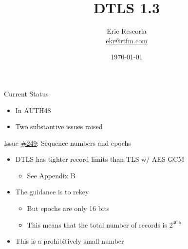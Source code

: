 \documentclass[helvetica]{beamer}
\title{DTLS 1.3}
\author{Eric Rescorla \\\url{ekr@rtfm.com}}
\date{\today}
\begin{document}
\begin{frame}
  \titlepage
\end{frame}


\begin{frame}{Current Status}

  \begin{itemize}
  \item In AUTH48
  \item Two substantive issues raised
  \end{itemize}
\end{frame}

\begin{frame}{Issue \href{https://github.com/tlswg/dtls13-spec/issues/249}{\#249}: Sequence numbers and epochs}

  \begin{itemize}
  \item DTLS has tighter record limits than TLS w/ AES-GCM
    \begin{itemize}
    \item See Appendix B      
    \end{itemize}

  \item The guidance is to rekey
    \begin{itemize}
    \item But epochs are only 16 bits
    \item This means that the total number of records is $2^{40.5}$     
    \end{itemize}

  \item This is a prohibitively small number    
  \end{itemize}
\end{frame}
\end{document}
